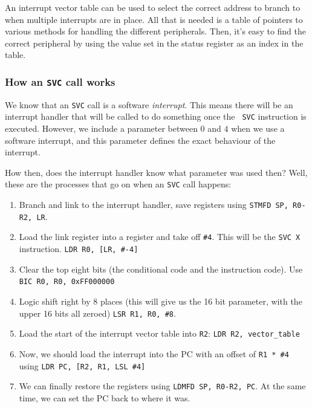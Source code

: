 An interrupt vector table can be used to select the correct address to branch to
when multiple interrupts are in place. All that is needed is a table of pointers
to various methods for handling the different peripherals. Then, it's easy to
find the correct peripheral by using the value set in the status register as an
index in the table.

\subsubsection{How an {\tt SVC} call works}

We know that an {\tt SVC} call is a software {\it interrupt}. This means there
will be an interrupt handler that will be called to do something once the {\tt
SVC} instruction is executed. However, we include a parameter between $0$ and
$4$ when we use a software interrupt, and this parameter defines the exact
behaviour of the interrupt.

How then, does the interrupt handler know what parameter was used then? Well,
these are the processes that go on when an {\tt SVC} call happens:

\begin{enumerate}
	\item Branch and link to the interrupt handler, save registers using 
	{\tt STMFD SP, {R0-R2, LR}}.

	\item Load the link register into a register and take off {\tt \#4}. This
	will be the {\tt SVC X} instruction. {\tt LDR R0, [LR, \#-4]}

	\item Clear the top eight bits (the conditional code and the instruction
	code). Use {\tt BIC R0, R0, 0xFF000000}

	\item Logic shift right by 8 places (this will give us the 16 bit parameter,
	with the upper 16 bits all zeroed) {\tt LSR R1, R0, \#8}.

	\item Load the start of the interrupt vector table into {\tt R2}: 
	{\tt LDR R2, vector\_table}

	\item Now, we should load the interrupt into the PC with an offset of
	{\tt R1 * \#4} using {\tt LDR PC, [R2, R1, LSL \#4]}

	\item We can finally restore the registers using 
	{\tt LDMFD SP, {R0-R2, PC}}. At the same time, we can set the PC back to 
	where it was.
\end{enumerate}

